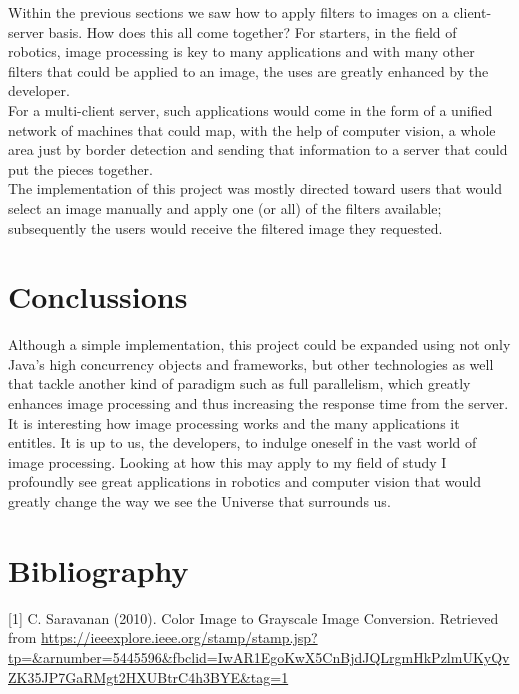 \documentclass[a4paper,12pt]{article}
\begin{document}
	Within the previous sections we saw how to apply filters to images on a client-server basis. How does this all come together? For starters, in the field of robotics, image processing is key to many applications and with many other filters that could be applied to an image, the uses are greatly enhanced by the developer.\\
	
	For a multi-client server, such applications would come in the form of a unified network of machines that could map, with the help of computer vision, a whole area just by border detection and sending that information to a server that could put the pieces together.\\
	
	The implementation of this project was mostly directed toward users that would select an image manually and apply one (or all) of the filters available; subsequently the users would receive the filtered image they requested.\\

	\section{Conclussions}
	
	Although a simple implementation, this project could be expanded using not only Java's high concurrency objects and frameworks, but other technologies as well that tackle another kind of paradigm such as full parallelism, which greatly enhances image processing and thus increasing the response time from the server.\\
	
	It is interesting how image processing works and the many applications it entitles. It is up to us, the developers, to indulge oneself in the vast world of image processing. Looking at how this may apply to my field of study I profoundly see great applications in robotics and computer vision that would greatly change the way we see the Universe that surrounds us.
		
	\section{Bibliography}
	
	
	[1] C. Saravanan (2010). Color  Image to Grayscale Image Conversion. Retrieved from \url{https://ieeexplore.ieee.org/stamp/stamp.jsp?tp=&arnumber=5445596&fbclid=IwAR1EgoKwX5CnBjdJQLrgmHkPzlmUKyQvZK35JP7GaRMgt2HXUBtrC4h3BYE&tag=1}\\
	
\end{document}
